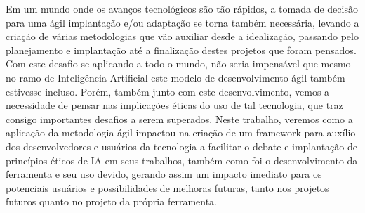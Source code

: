 

Em um mundo onde os avanços tecnológicos são tão rápidos, a tomada de decisão para uma ágil implantação e/ou adaptação se torna também necessária, levando a criação de várias metodologias que vão auxiliar desde a idealização, passando pelo planejamento e implantação até a finalização destes projetos que foram pensados. Com este desafio se aplicando a todo o mundo, não seria impensável que mesmo no ramo de Inteligência Artificial este modelo de desenvolvimento ágil também estivesse incluso. Porém, também junto com este desenvolvimento, vemos a necessidade de pensar nas implicações éticas do uso de tal tecnologia, que traz consigo importantes desafios a serem superados. Neste trabalho, veremos como a aplicação da metodologia ágil impactou na criação de um framework para auxílio dos desenvolvedores e usuários da tecnologia a facilitar o debate e implantação de princípios éticos de IA em seus trabalhos, também como foi o desenvolvimento da ferramenta e seu uso devido, gerando assim um impacto imediato para os potenciais usuários e possibilidades de melhoras futuras, tanto nos projetos futuros quanto no projeto da própria ferramenta.